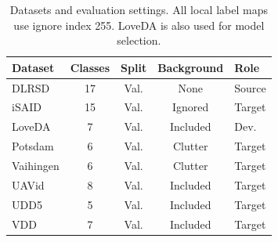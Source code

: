 \begin{table}[!tb]
\centering
\caption{Datasets and evaluation settings. All local label maps use ignore index 255. LoveDA is also used for model selection.}
\label{tab:datasets_protocol}
\small
\setlength{\tabcolsep}{4pt}
\begin{tabular}{lcccl}
\toprule
Dataset & Classes & Split & Background & Role\\
\midrule
DLRSD~\cite{PerformanceEvaluationSingleLabel} & 17 & Val. & None & Source\\
iSAID~\cite{zamirISAIDLargescaleDataset2019} & 15 & Val. & Ignored & Target\\
LoveDA~\cite{wangLoveDARemoteSensing2022} & 7 & Val. & Included & Dev.\\
Potsdam & 6 & Val. & Clutter & Target\\
Vaihingen & 6 & Val. & Clutter & Target\\
UAVid~\cite{lyuUAVidSemanticSegmentation2020} & 8 & Val. & Included & Target\\
UDD5~\cite{chenLargeScaleStructureMotion2018} & 5 & Val. & Included & Target\\
VDD~\cite{caiVDDVariedDrone2025} & 7 & Val. & Included & Target\\
\bottomrule
\end{tabular}
\end{table}

